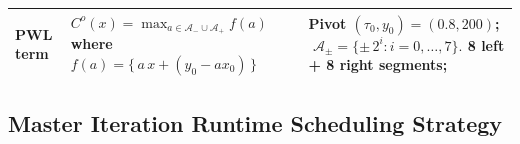 \documentclass[opre,sglanonrev]{informs4}
\begin{document}
{\begin{APPENDICES}
\begin{table}[!hbtp]
\begin{tabular}{p{2.0cm} p{4.5cm} p{8.5cm}}
PWL term
 & \makecell[l]{
 $\displaystyle
C^o(x)=\max_{a\in\mathcal{A}_-\cup\mathcal{A}_+}f(a)$ where\\
 $f(a) = \{\,a\,x + (y_0 - a x_0)\,\}$
 }
    & 
    \makecell[l]{Pivot $(\tau_0,y_0)=(0.8,200)$; $
\,\,
\mathcal{A}_\pm=\{\pm\,2^i : i=0,\dots,7\}.
$ \\
 8 left + 8 right segments;
} \\
\bottomrule
\end{tabular}
\end{table}


\subsection{Master Iteration Runtime Scheduling Strategy}



\end{APPENDICES}}
\end{document}
